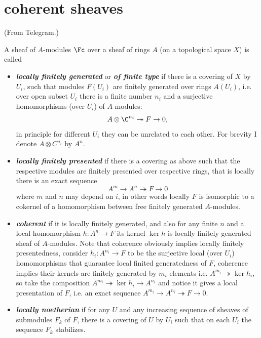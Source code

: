 \section{coherent sheaves}

(From Telegram.)

\begin{defn}A sheaf of $A$-modules $\Fc$ over a sheaf of rings $A$ (on a topological space $X$) is called
	\begin{itemize}
		\item \textbf{\textit{locally finitely generated}} or \textbf{\textit{of finite type}} if there is a covering of $X$ by $U_i$, such that modules $F(U_i)$ are finitely generated over rings $A(U_i)$, i.e. over open subset $U_i$ there is a finite number $n_i$ and a surjective homomorphisms (over $U_i$) of $A$-modules: 
		\[A \otimes \C^{n_i}\twoheadrightarrow F\to 0,\] in principle for different $U_i$ they can be unrelated to each other.   For brevity I denote $A \otimes C^{n_i}$ by $A^n$.
		
		\item \textbf{\textit{locally finitely presented}} if there is a covering as above such that the respective modules are finitely presented over respective rings, that is  locally there is an exact sequence 
		\[A^m\to A^n\twoheadrightarrow F\to 0\]
		where $m$ and $n$ may depend on $i$, in other words locally $F$ is isomorphic to a cokernel of a homomorphism between free finitely generated $A$-modules.
		
		\item \textbf{\textit{coherent}} if it is locally finitely generated, and also for any finite $n$ and a local homomorphism $h : A^n \to F$ its kernel $\ker h$ is locally finitely generated sheaf of $A$-modules. Note that coherence obviously implies locally finitely presentedness,  consider $h_i : A^{n_i} \to F$ to be the surjective local (over $U_i$) homomorphisms that guarantee local finited generatedness of $F$, coherence implies their kernels are finitely generated by $m_i$ elements i.e. $A^{m_i} \twoheadrightarrow \ker h_i$, so take the composition $A^{m_i}\twoheadrightarrow \ker h_i \to A^{n_i}$ and notice it gives a local presentation of $F$, i.e. an exact sequence $A^{m_i} \to A^{n_i}\twoheadrightarrow F\to 0$.

		\item \textbf{\textit{locally noetherian}} if for any $U$ and any increasing sequence of sheaves of submodules $F_k$ of $F$, there is a covering of $U$ by $U_i$ such that on each $U_i$ the sequence $F_k$ stabilizes. 
	\end{itemize}
\end{defn}

